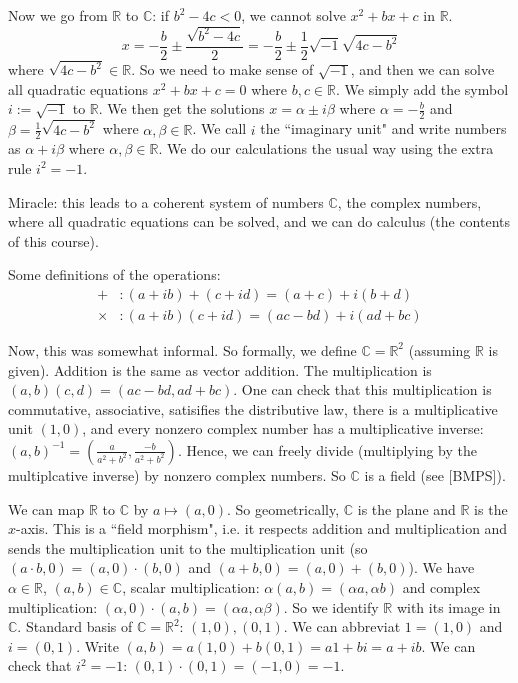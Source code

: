 \documentclass{article}
\theoremstyle{plain}
\theoremstyle{remark}
\newcommand{\R}{{\mathbb R}}
\newcommand{\C}{{\mathbb C}}
\begin{document}
Now we go from $\R$ to $\C$: if $b^2 - 4c < 0$, we cannot solve $x^2+bx+c$ in $\R$.
\[
	x = -\frac{b}{2} \pm \frac{\sqrt{b^2 - 4c}}{2}
	= -\frac{b}{2} \pm \frac12 \sqrt{-1}\sqrt{4c-b^2}
\]
where $\sqrt{4c-b^2} \in \R$.
So we need to make sense of $\sqrt{-1}$,
and then we can solve all quadratic equations $x^2+bx+c=0$ where $b,c \in \R$.
We simply add the symbol $i := \sqrt{-1}$ to $\R$.
We then get the solutions $x = \alpha \pm i\beta$ where $\alpha = -\frac{b}{2}$
and $\beta = \frac12 \sqrt{4c - b^2}$ where $\alpha,\beta \in \R$.
We call $i$ the ``imaginary unit" and write numbers as $\alpha + i\beta$
where $\alpha,\beta \in \R$.
We do our calculations the usual way using the extra rule $i^2 = -1$.

Miracle: this leads to a coherent system of numbers $\C$,
the complex numbers,
where all quadratic equations can be solved, and we can do calculus (the contents of this course).

Some definitions of the operations:
\begin{align*}
	+ &\colon (a + ib) + (c + id) = (a+c) + i(b + d)\\
	\times &\colon (a+ib)(c+id) = (ac - bd) + i(ad + bc)
\end{align*}

Now, this was somewhat informal.
So formally, we define $\C = \R^2$ (assuming $\R$ is given).
Addition is the same as vector addition.
The multiplication is $(a,b)(c,d) = (ac-bd,ad+bc)$.
One can check that this multiplication is commutative, associative,
satisifies the distributive law,
there is a multiplicative unit $(1,0)$,
and every nonzero complex number has a multiplicative inverse:
$(a,b)^{-1} = \left(\frac{a}{a^2+b^2}, \frac{-b}{a^2+b^2}\right)$.
Hence, we can freely divide (multiplying by the multiplcative inverse)
by nonzero complex numbers.
So $\C$ is a field (see [BMPS]).

We can map $\R$ to $\C$ by $a \mapsto (a,0)$.
So geometrically, $\C$ is the plane and $\R$ is the $x$-axis.
This is a ``field morphism",
i.e. it respects addition and multiplication and sends the multiplication unit
to the multiplication unit
(so $(a\cdot b, 0) = (a,0)\cdot (b,0)$
and $(a+b,0) = (a,0) + (b,0)$).
We have $\alpha \in \R$, $(a,b) \in \C$,
scalar multiplication: $\alpha(a,b) = (\alpha a, \alpha b)$
and complex multiplication: $(\alpha,0)\cdot(a,b) = (\alpha a, \alpha \beta)$.
So we identify $\R$ with its image in $\C$.
Standard basis of $\C = \R^2$: $(1,0), (0,1)$.
We can abbreviat $1 = (1,0)$ and $i = (0,1)$.
Write $(a,b) = a(1,0) + b(0,1) = a1 + bi = a + ib$.
We can check that $i^2 = -1$: $(0,1)\cdot(0,1) = (-1,0) = -1$.
\end{document}
